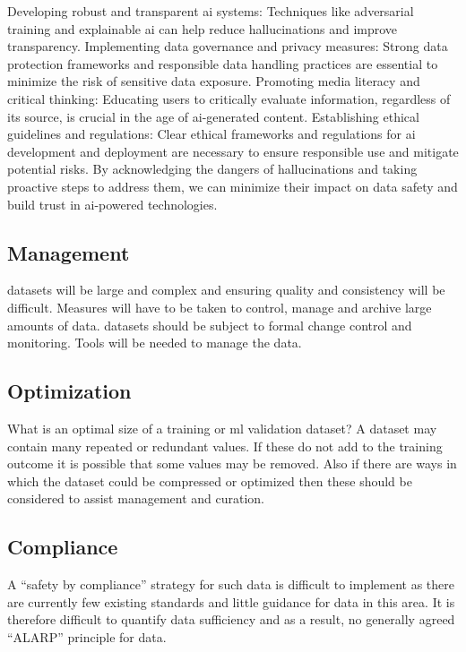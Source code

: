 \begin{aibox}
Developing robust and transparent \gls{ai} systems: Techniques like adversarial training and explainable \gls{ai} can help reduce hallucinations and improve transparency.
Implementing data governance and privacy measures: Strong data protection frameworks and responsible data handling practices are essential to minimize the risk of sensitive data exposure.
Promoting media literacy and critical thinking: Educating users to critically evaluate \gls{information}, regardless of its source, is crucial in the age of \gls{ai}-generated content.
Establishing ethical guidelines and regulations: Clear ethical frameworks and regulations for \gls{ai} development and deployment are necessary to ensure responsible use and mitigate potential risks.
By acknowledging the dangers of hallucinations and taking proactive steps to address them, we can minimize their impact on data safety and build trust in \gls{ai}-powered technologies.
\end{aibox}

\subsection{ Management}
\Glspl{dataset} will be large and complex and ensuring quality and \gls{consistency} will be difficult. Measures will have to be taken to control, manage and archive large amounts of data. \Glspl{dataset} should be subject to formal change control and monitoring. Tools will be needed to manage the data.

\subsection{Optimization}
What is an optimal size of a training or
\gls{ml}
validation \gls{dataset}? A \gls{dataset} may contain many repeated or redundant values. If these do not add to the training outcome it is possible that some values may be removed. Also if there are ways in which the \gls{dataset} could be compressed or optimized then these should be considered to assist management and curation.

\subsection{Compliance}
A ``safety by compliance'' strategy for such data is difficult to implement as there are currently
few existing standards and little guidance for data in this area.
It is therefore difficult to quantify data sufficiency and as a result, no generally agreed ``ALARP'' principle for data.

